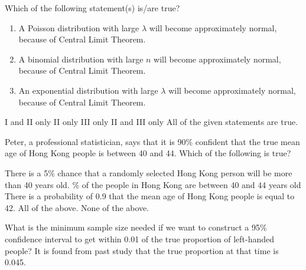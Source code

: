 \documentclass[letterpaper,10pt,addpoints]{exam}
\begin{document}
\begin{questions}
  \question Which of the following statement(s) is/are true?
  \begin{enumerate}[I]
    \item A Poisson distribution with large $\lambda$ will become approximately normal, because of Central Limit Theorem.
    \item A binomial distribution with large $n$ will become approximately normal, because of Central Limit Theorem.
    \item An exponential distribution with large $\lambda$ will become approximately normal, because of Central Limit Theorem.
  \end{enumerate}
  \begin{choices}
    \correctchoice I and II only
    \choice II only
    \choice III only
    \choice II and III only
    \choice All of the given statements are true.
    \end{choices}

\question Peter, a professional statistician, says that it is 90\% confident that the true mean age of Hong Kong people is between 40 and 44. Which of the following is true?
\begin{choices}
  \choice There is a 5\% chance that a randomly selected Hong Kong person will be more than 40 years old.
  \% of the people in Hong Kong are between 40 and 44 years old
  \choice There is a probability of 0.9 that the mean age of Hong Kong people is equal to 42.
  \choice All of the above.
  \correctchoice None of the above.
\end{choices}


\question What is the minimum sample size needed if we want to construct a 95\% confidence interval to get within 0.01 of the true proportion of left-handed people? It is found from past study that the true proportion at that time is 0.045.
\begin{choices}
\end{choices}



\end{questions}
\end{document}
